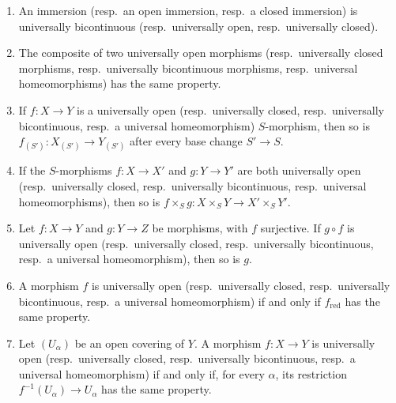 \begin{proposition}[2.4.3]
\label{IV.2.4.3}
\medskip\noindent
\begin{enumerate}
  \item[\textup{(i)}] An immersion \textup{(resp.}\ an open immersion, \textup{resp.}\ a closed immersion\textnormal{)} is universally bicontinuous \textup{(resp.}\ universally open, \textup{resp.}\ universally closed\textnormal{)}.
  \item[\textup{(ii)}] The composite of two universally open morphisms \textup{(resp.}\ universally closed morphisms, \textup{resp.}\ universally bicontinuous morphisms, \textup{resp.}\ universal homeomorphisms\textnormal{)} has the same property.
  \item[\textup{(iii)}] If $f:X\to Y$ is a universally open \textup{(resp.}\ universally closed, \textup{resp.}\ universally bicontinuous, \textup{resp.}\ a universal homeomorphism\textnormal{)} $S$-morphism, then so is $f_{(S')}:X_{(S')}\to Y_{(S')}$ after every base change $S'\to S$.
  \item[\textup{(iv)}] If the $S$-morphisms $f:X\to X'$ and $g:Y\to Y'$ are both universally open \textup{(resp.}\ universally closed, \textup{resp.}\ universally bicontinuous, \textup{resp.}\ universal homeomorphisms\textnormal{)}, then so is $f\times_S g:X\times_S Y\to X'\times_S Y'$.
  \item[\textup{(v)}] Let $f:X\to Y$ and $g:Y\to Z$ be morphisms, with $f$ surjective. If $g\circ f$ is universally open \textup{(resp.}\ universally closed, \textup{resp.}\ universally bicontinuous, \textup{resp.}\ a universal homeomorphism\textnormal{)}, then so is $g$.
  \item[\textup{(vi)}] A morphism $f$ is universally open \textup{(resp.}\ universally closed, \textup{resp.}\ universally bicontinuous, \textup{resp.}\ a universal homeomorphism\textnormal{)} if and only if $f_{\mathrm{red}}$ has the same property.
  \item[\textup{(vii)}] Let $(U_\alpha)$ be an open covering of $Y$. A morphism $f:X\to Y$ is universally open \textup{(resp.}\ universally closed, \textup{resp.}\ universally bicontinuous, \textup{resp.}\ a universal homeomorphism\textnormal{)} if and only if, for every $\alpha$, its restriction $f^{-1}(U_\alpha)\to U_\alpha$ has the same property.
\end{enumerate}
\end{proposition}

